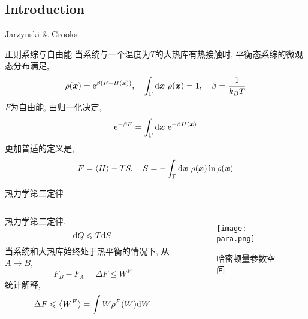     \subsection{Introduction}
    \begin{frame}{Jarzynski \& Crooks}
        \hspace{.05\textwidth}
        \begin{figure}
            \centering
            \vspace{.05\textwidth}
        \end{figure}
    \end{frame}
    \begin{frame}{正则系综与自由能}
        当系统与一个温度为$T$的大热库有热接触时, 平衡态系综的微观态分布满足, 
        \begin{equation}
            \rho(\vb*x) = \mathrm{e}^{\beta(F - H(\vb*x))}, \quad \int_\Gamma\dd\vb*x\ \rho(\vb*x) = 1,\quad \beta = \frac1{k_B T}
        \end{equation}
        $F$为自由能, 由归一化决定,
        \begin{equation}
            \mathrm{e}^{-\beta F} = \int_\Gamma\dd\vb*x\ \mathrm{e}^{- \beta H(\vb*x)}
        \end{equation}
        更加普适的定义是,
        \begin{equation}
            F = \expval{H} - T S,\quad S = -\int_\Gamma\dd\vb*x\ \rho(\vb*x)\ln \rho(\vb*x)
        \end{equation}
    \end{frame}
    \begin{frame}{热力学第二定律}
        \begin{columns}
            热力学第二定律,
            \begin{equation}
                \dd\hspace*{-0.08em}\bar{}\hspace*{0.1em} Q \leqslant T\dd S 
            \end{equation}
            当系统和大热库始终处于热平衡的情况下, 从$A\to B$,
            \begin{equation}
                F_B - F_A = \Delta F \leqslant W^F 
            \end{equation}
            统计解释,
            \begin{equation}
                \Delta F \leqslant \expval{W^F} = \int W\rho^F(W)\dd W
            \end{equation}
            \begin{figure}
                \centering
                \texttt{[image: para.png]}
                \caption{哈密顿量参数空间}
            \end{figure}
        \end{columns}
    \end{frame}
